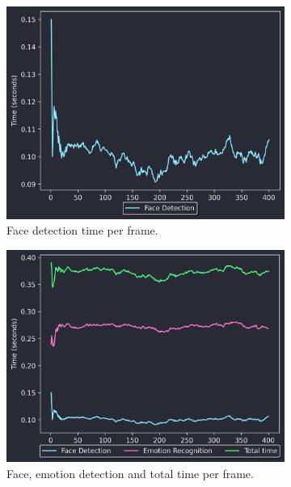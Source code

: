 \begin{figure}[h]
    \centering
    \begin{subfigure}[t]{0.32\textwidth}
        \centering
        \includegraphics[width = \textwidth]{resources/faceFPS.png}
        \caption{Face detection time per frame.}\label{fig:faceFPS}
    \end{subfigure}
    \begin{subfigure}[t]{0.32\textwidth}
        \centering
        \includegraphics[width = \textwidth]{resources/face_emoFPS.png}
        \caption{Face, emotion detection and total time per frame.}\label{fig:faceemoFPS}
    \end{subfigure}
    \begin{subfigure}[t]{0.32\textwidth}

\end{subfigure}
\end{figure}
